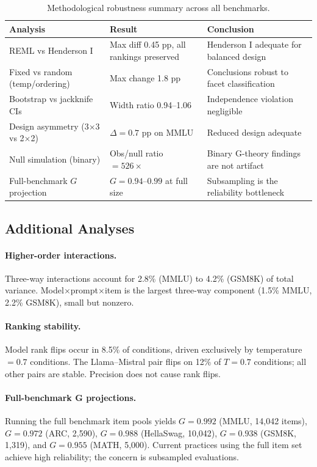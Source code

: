 \documentclass[11pt]{article}
\begin{document}
\begin{table}[t]
\centering
\caption{Methodological robustness summary across all benchmarks.}
\label{tab:robustness}
\small
\begin{tabular}{@{}p{3.2cm}p{4.0cm}p{4.5cm}@{}}
\toprule
Analysis & Result & Conclusion \\
\midrule
REML vs Henderson I & Max diff 0.45 pp, all rankings preserved & Henderson I adequate for balanced design \\
Fixed vs random (temp/ordering) & Max change 1.8 pp & Conclusions robust to facet classification \\
Bootstrap vs jackknife CIs & Width ratio 0.94--1.06 & Independence violation negligible \\
Design asymmetry (3$\times$3 vs 2$\times$2) & $\Delta = 0.7$ pp on MMLU & Reduced design adequate \\
Null simulation (binary) & Obs/null ratio $= 526\times$ & Binary G-theory findings are not artifact \\
Full-benchmark $G$ projection & $G = 0.94$--$0.99$ at full size & Subsampling is the reliability bottleneck \\
\bottomrule
\end{tabular}
\end{table}

\subsection{Additional Analyses}

\paragraph{Higher-order interactions.}
Three-way interactions account for 2.8\% (MMLU) to 4.2\% (GSM8K) of total variance.
Model$\times$prompt$\times$item is the largest three-way component (1.5\% MMLU, 2.2\% GSM8K), small but nonzero.

\paragraph{Ranking stability.}
Model rank flips occur in 8.5\% of conditions, driven exclusively by temperature $= 0.7$ conditions.
The Llama--Mistral pair flips on 12\% of $T = 0.7$ conditions; all other pairs are stable.
Precision does not cause rank flips.

\paragraph{Full-benchmark G projections.}
Running the full benchmark item pools yields $G = 0.992$ (MMLU, 14{,}042 items), $G = 0.972$ (ARC, 2{,}590), $G = 0.988$ (HellaSwag, 10{,}042), $G = 0.938$ (GSM8K, 1{,}319), and $G = 0.955$ (MATH, 5{,}000).
Current practices using the full item set achieve high reliability; the concern is subsampled evaluations.
\end{document}
